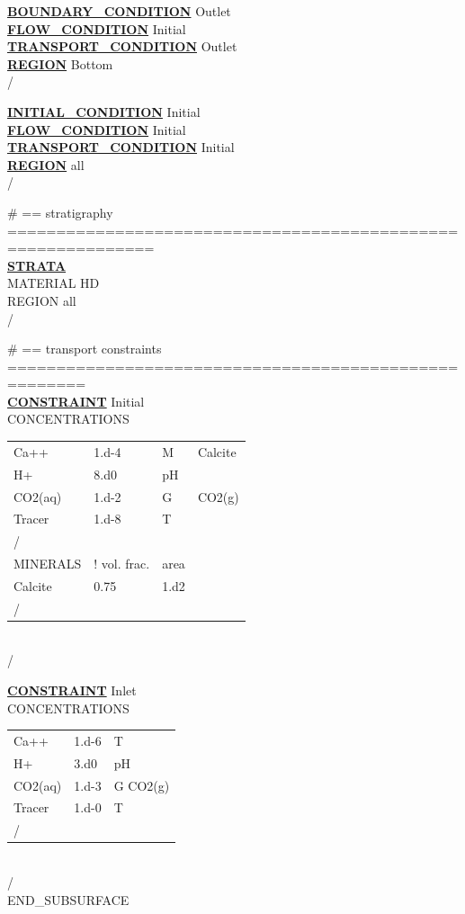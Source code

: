 \noindent
\hyperlink{target_bcon}{\bf BOUNDARY\_CONDITION} Outlet\\
\hyperlink{target_flow_cond}{\bf FLOW\_CONDITION} Initial\\
\hyperlink{target_trans_cond}{\bf TRANSPORT\_CONDITION} Outlet\\
\hyperlink{target_region}{\bf REGION} Bottom\\
/

\noindent
\hyperlink{target_init}{\bf INITIAL\_CONDITION} Initial\\
\hyperlink{target_flow_cond}{\bf FLOW\_CONDITION} Initial\\
\hyperlink{target_trans_cond}{\bf TRANSPORT\_CONDITION} Initial\\
\hyperlink{target_region}{\bf REGION} all\\
/

\noindent
\# == stratigraphy =============================================================\\
\hyperlink{target_strata}{\bf STRATA}\\
MATERIAL HD\\
REGION all\\
/

\noindent
\# == transport constraints ======================================================\\
\hyperlink{target_constraint}{\bf CONSTRAINT} Initial\\
CONCENTRATIONS\\
\begin{tabular}{llll}
Ca++    &1.d-4   &M  &Calcite\\[-4pt]
H+      &8.d0   &pH\\[-4pt]
CO2(aq) &1.d-2   &G  &CO2(g)\\[-4pt]
Tracer  &1.d-8   &T\\[-4pt]
/\\[-4pt]
MINERALS &! vol. frac.  &area\\[-4pt]
Calcite      &0.75      &1.d2\\[-4pt]
/\\[-4pt]
\end{tabular}\\
/

\noindent
\hyperlink{target_constraint}{\bf CONSTRAINT} Inlet\\
CONCENTRATIONS\\
\begin{tabular}{lll}
Ca++    &1.d-6   &T\\[-4pt]
H+      &3.d0   &pH\\[-4pt]
CO2(aq) &1.d-3   &G  CO2(g)\\[-4pt]
Tracer  &1.d-0   &T\\[-4pt]
/\\[-4pt]
\end{tabular}\\
/\\[-4pt]
END\_SUBSURFACE

